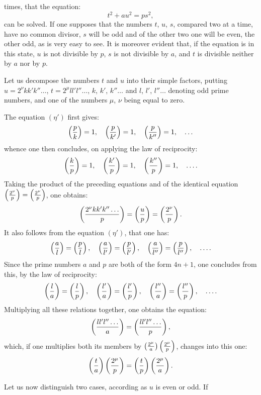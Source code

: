 \noindent
times, that the equation:
\begin{equation*}\tag{$\eta'$}
t^2+au^2=ps^2,
\end{equation*}
can be solved. If one supposes that the numbers $t$, $u$, $s$, compared two at a
time, have no common divisor, $s$ will be odd and of the other two one will be
even, the other odd, as is very easy to see. It is moreover evident
that, if the equation is in this state, $u$ is not divisible by $p$, $s$ is not divisible
by $a$, and $t$ is divisible neither by $a$ nor by $p$.
\par\indent
Let us decompose the numbers $t$ and $u$ into their simple factors, putting
$u=2^\nu kk'k''\ldots$, $t=2^\mu ll'l''\ldots$, $k$, $k'$, $k''\ldots$ and $l$, $l'$, $l''\ldots$ denoting odd
prime numbers, and one of the numbers $\mu$, $\nu$ being equal to zero.
\par\indent
The equation $(\eta')$ first gives:
\[
\left(\frac{p}{k}\right)=1,\quad\left(\frac{p}{k'}\right)=1,\quad\left(\frac{p}{k''}\right)=1,\quad\ldots
\]
whence one then concludes, on applying the law of reciprocity:
\[
\left(\frac{k}{p}\right)=1,\quad\left(\frac{k'}{p}\right)=1,\quad\left(\frac{k''}{p}\right)=1,\quad\ldots.
\]
Taking the product of the preceding equations and of the identical equation $\left(\frac{2^\nu}{p}\right)=\left(\frac{2^\nu}{p}\right)$,
one obtains:
\[
\left(\frac{2^\nu kk'k''\ldots}{p}\right)=\left(\frac{u}{p}\right)=\left(\frac{2^\nu}{p}\right).
\]
It also follows from the equation $(\eta')$, that one has:
\[
\left(\frac{a}{l}\right)=\left(\frac{p}{l}\right),\quad\left(\frac{a}{l'}\right)=\left(\frac{p}{l'}\right),\quad
\left(\frac{a}{l''}\right)=\left(\frac{p}{l''}\right),\quad\ldots.
\]
Since the prime numbers $a$ and $p$ are both of the form $4n+1$,
one concludes from this, by the law of reciprocity:
\[
\left(\frac{l}{a}\right)=\left(\frac{l}{p}\right),\quad\left(\frac{l'}{a}\right)=\left(\frac{l'}{p}\right),\quad
\left(\frac{l''}{a}\right)=\left(\frac{l''}{p}\right),\quad\ldots.
\]
Multiplying all these relations together, one obtains the equation:
\[
\left(\frac{ll'l''\ldots}{a}\right)=\left(\frac{ll'l''\ldots}{p}\right),
\]
which, if one multiplies both its members by $\left(\frac{2^\mu}{a}\right)\left(\frac{2^\mu}{p}\right)$, changes into this one:
\[
\left(\frac{t}{a}\right)\left(\frac{2^\mu}{p}\right)=\left(\frac{t}{p}\right)\left(\frac{2^\mu}{a}\right).
\]
\par\indent
Let us now distinguish two cases, according as $u$ is even or odd. If
